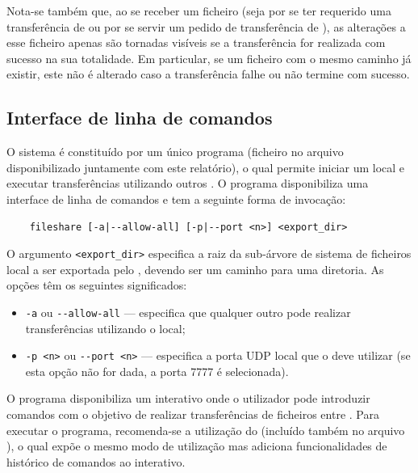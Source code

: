 Nota-se também que, ao se receber um ficheiro (seja por se ter requerido uma transferência de  ou por se servir um pedido de transferência de ), as alterações a esse ficheiro apenas são tornadas visíveis se a transferência for realizada com sucesso na sua totalidade. Em particular, se um ficheiro com o mesmo caminho já existir, este não é alterado caso a transferência falhe ou não termine com sucesso.


\subsection{Interface de linha de comandos}

O sistema \SYS é constituído por um único programa (ficheiro  no arquivo \ARQUIVO disponibilizado juntamente com este relatório), o qual permite iniciar um  local e executar transferências utilizando outros . O programa disponibiliza uma interface de linha de comandos e tem a seguinte forma de invocação:

\begin{verbatim}
    fileshare [-a|--allow-all] [-p|--port <n>] <export_dir>
\end{verbatim}

O argumento \verb|<export_dir>| especifica a raiz da sub-árvore de sistema de ficheiros local a ser exportada pelo , devendo ser um caminho para uma diretoria. As opções têm os seguintes significados:

\begin{itemize}

    \item \verb|-a| ou \verb|--allow-all| --- especifica que qualquer outro  pode realizar transferências utilizando o  local;
    
    \item \verb|-p <n>| ou \verb|--port <n>| --- especifica a porta UDP local que o  deve utilizar (se esta opção não for dada, a porta 7777 é selecionada).

\end{itemize}

O programa disponibiliza um  interativo onde o utilizador pode introduzir comandos com o objetivo de realizar transferências de ficheiros entre . Para executar o programa, recomenda-se a utilização do   (incluído também no arquivo \ARQUIVO), o qual expõe o mesmo modo de utilização mas adiciona funcionalidades de histórico de comandos ao  interativo.

